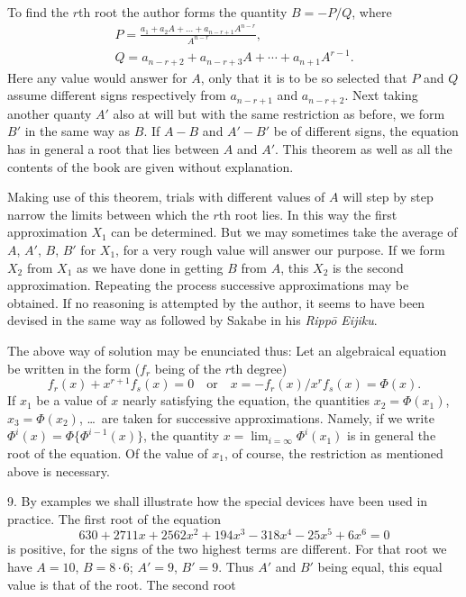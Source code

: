 \documentclass[11pt]{article}
\begin{document}
To find the $r$th root the author forms the quantity $B = -P/Q$, where
\begin{gather*}
P = \frac{a_1 + a_2 A + \ldots + a_{n-r+1} A^{n-r}}{A^{n-r}},\\
Q = a_{n-r+2} + a_{n-r+3} A + \cdots + a_{n+1} A^{r-1}.
\end{gather*}
Here any value would answer for $A$, only that it is to be so selected that $P$ and $Q$ assume different signs respectively from $a_{n-r+1}$ and $a_{n-r+2}$. Next taking another quanty $A'$ also at will but with the same restriction as before, we form $B'$ in the same way as $B$. If $A - B$ and $A' - B'$ be of different signs, the equation has in general a root that lies between $A$ and $A'$. This theorem as well as all the contents of the book are given without explanation.

Making use of this theorem, trials with different values of $A$ will step by step narrow the limits between which the $r$th root lies. In this way the first approximation $X_1$ can be determined. But we may sometimes take the average of $A$, $A'$, $B$, $B'$ for $X_1$, for a very rough value will answer our purpose. If we form $X_2$ from $X_1$ as we have done in getting $B$ from $A$, this $X_2$ is the second approximation. Repeating the process successive approximations may be obtained. If no reasoning is attempted by the author, it seems to have been devised in the same way as followed by Sakabe in his \emph{Rippō Eijiku}.

The above way of solution may be enunciated thus: Let an algebraical equation be written in the form ($f_r$ being of the $r$th degree)
\[ f_r(x) + x^{r+1} f_s(x) = 0 \quad\text{or}\quad x = -f_r(x)/x^r f_s(x) = \Phi(x). \]
If $x_1$ be a value of $x$ nearly satisfying the equation, the quantities $x_2 = \Phi(x_1)$, $x_3 = \Phi(x_2)$, \dots\ are taken for successive approximations. Namely, if we write $\Phi^i(x) = \Phi\{\Phi^{i-1}(x)\}$, the quantity $x = \lim_{i=\infty} \Phi^i(x_1)$ is in general the root of the equation. Of the value of $x_1$, of course, the restriction as mentioned above is necessary.

9. By examples we shall illustrate how the special devices have been used in practice. The first root of the equation
\[ 630 + 2711x + 2562x^2 + 194x^3 - 318x^4 - 25x^5 + 6x^6 = 0 \]
is positive, for the signs of the two highest terms are different. For that root we have $A = 10$, $B = 8{\cdot}6$; $A' = 9$, $B' = 9$. Thus $A'$ and $B'$ being equal, this equal value is that of the root. The second root
\end{document}

